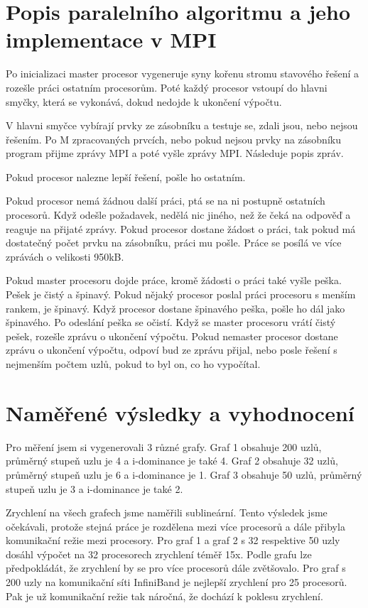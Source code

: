 \documentclass[12pt]{article}
\begin{document}
\section{Popis paralelního algoritmu a jeho implementace v MPI}

Po inicializaci master procesor vygeneruje syny kořenu stromu stavového řešení a rozešle práci ostatním procesorům. Poté každý procesor vstoupí do hlavni smyčky, která se vykonává, dokud nedojde k ukončení výpočtu.

V hlavni smyčce vybírají prvky ze zásobníku a testuje se, zdali jsou, nebo nejsou řešením. Po M zpracovaných prvcích, nebo pokud nejsou prvky na zásobníku program přijme zprávy MPI a poté vyšle zprávy MPI. Následuje popis zpráv.

Pokud procesor nalezne lepší řešení, pošle ho ostatním.

Pokud procesor nemá žádnou další práci, ptá se na ni postupně ostatních procesorů. Když odešle požadavek, nedělá nic jiného, než že čeká na odpověď a reaguje na přijaté zprávy. Pokud procesor dostane žádost o práci, tak pokud má dostatečný počet prvku na zásobníku, práci mu pošle. Práce se posílá ve více zprávách o velikosti 950kB.

Pokud master procesoru dojde práce, kromě žádosti o práci také vyšle peška. Pešek je čistý a špinavý. Pokud nějaký procesor poslal práci procesoru s menším rankem, je špinavý. Když procesor dostane špinavého peška, pošle ho dál jako špinavého. Po odeslání peška se očistí. Když se master procesoru vrátí čistý pešek, rozešle zprávu o ukončení výpočtu. Pokud nemaster procesor dostane zprávu o ukončení výpočtu, odpoví bud ze zprávu přijal, nebo posle řešení s nejmenším počtem uzlů, pokud to byl on, co ho vypočítal.

\section{Naměřené výsledky a vyhodnocení}
Pro měření jsem si vygenerovali 3 různé grafy. Graf 1 obsahuje 200 uzlů, průměrný stupeň uzlu je 4 a i-dominance je také 4. Graf 2 obsahuje 32 uzlů, průměrný stupeň uzlu je 6 a i-dominance je 1. Graf 3 obsahuje 50 uzlů, průměrný stupeň uzlu je 3 a i-dominance je také 2.

Zrychlení na všech grafech jsme naměřili sublineární. Tento výsledek jsme očekávali, protože stejná práce je rozdělena mezi více procesorů a dále přibyla komunikační režie mezi procesory. Pro graf 1 a graf 2 s 32 respektive 50 uzly dosáhl výpočet na 32 procesorech zrychlení téměř 15x. Podle grafu lze předpokládát, že zrychlení by se pro více procesorů dále zvětšovalo. Pro graf s 200 uzly na komunikační síti InfiniBand je nejlepší zrychlení pro 25 procesorů. Pak je už komunikační režie tak náročná, že dochází k poklesu zrychlení.
\end{document}
